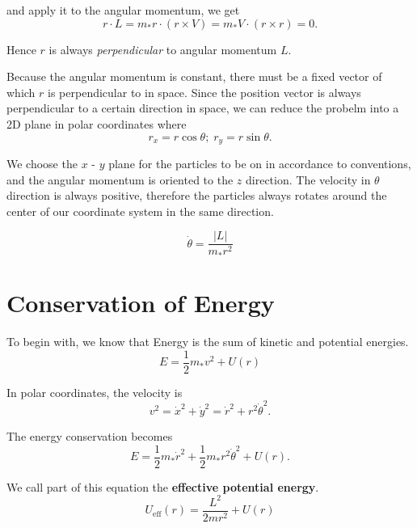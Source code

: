 \documentclass{article}
\begin{document}
and apply it to the angular momentum, we get
\begin{equation}
    r\cdot L = m_\ast r \cdot (r\times V) = m_\ast V \cdot (r\times r) = 0.
\end{equation}

Hence $r$ is always \emph{perpendicular} to angular momentum $L$.

Because the angular momentum is constant, there must be a fixed vector of which $r$ is perpendicular to in space.
Since the position vector is always perpendicular to a certain direction in space, we can reduce the probelm into a 
2D plane in polar coordinates where
\begin{equation}
    r_x = r \cos{\theta}; \; r_y = r\sin{\theta}.
\end{equation}

We choose the $x$ - $y$ plane for the particles to be on in accordance to conventions, and the angular momentum
is oriented to the $z$ direction. The velocity in $\theta$ direction is always positive, therefore the 
particles always rotates around the center of our coordinate system in the same direction.

\begin{equation}
    \dot{\theta} = \frac{|L|}{m_\ast r^2}
\end{equation}

\section{Conservation of Energy}
To begin with, we know that Energy is the sum of kinetic and potential energies.
\begin{equation}
    E = \frac{1}{2}m_\ast v^2 + U(r)
\end{equation}

In polar coordinates, the velocity is
\begin{equation}
    v^2 = \dot{x}^2 + \dot{y}^2 = \dot{r}^2 + r^2 \dot{\theta} ^2.
\end{equation}

The energy conservation becomes
\begin{equation}
    E = \frac{1}{2} m_\ast \dot{r}^2 + \frac{1}{2} m_\ast r^2 \dot{\theta}^2 + U(r).
\end{equation}

We call part of this equation the \textbf{effective potential energy}.
\begin{equation}
    U_{\textrm{eff}}(r) = \frac{L^2}{2 m r^2} + U(r)
\end{equation}
\end{document}
